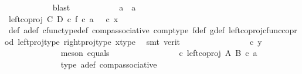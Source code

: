 \begin{isabellebody}
\ \ \ \ \ \ \ \ \ \ \isamarkupfalse%
\ blast\isanewline
\ \ \ \ \ \ \ \ \isamarkupfalse%
\ \isamarkupfalse%
\ {\isachardoublequoteopen}a\ {\isacharequal}{\kern0pt}\ a{\isacharprime}{\kern0pt}{\isachardoublequoteclose}\isanewline
\ \ \ \ \ \ \ \ \isamarkupfalse%
\ {\isacharminus}{\kern0pt}\ \isanewline
\ \ \ \ \ \ \ \ \ \ \isamarkupfalse%
\ {\isachardoublequoteopen}{\isacharparenleft}{\kern0pt}left{\isacharunderscore}{\kern0pt}coproj\ C\ D\ {\isasymcirc}\isactrlsub c\ f{\isacharparenright}{\kern0pt}\ {\isasymcirc}\isactrlsub c\ a\ {\isacharequal}{\kern0pt}\ {\isasymphi}\ {\isasymcirc}\isactrlsub c\ x{\isachardoublequoteclose}\isanewline
\ \ \ \ \ \ \ \ \ \ \ \ \isamarkupfalse%
\ {\isasymphi}{\isacharunderscore}{\kern0pt}def\ a{\isacharunderscore}{\kern0pt}def\ cfunc{\isacharunderscore}{\kern0pt}type{\isacharunderscore}{\kern0pt}def\ comp{\isacharunderscore}{\kern0pt}associative\ comp{\isacharunderscore}{\kern0pt}type\ f{\isacharunderscore}{\kern0pt}def\ g{\isacharunderscore}{\kern0pt}def\ left{\isacharunderscore}{\kern0pt}coproj{\isacharunderscore}{\kern0pt}cfunc{\isacharunderscore}{\kern0pt}coprod\ left{\isacharunderscore}{\kern0pt}proj{\isacharunderscore}{\kern0pt}type\ right{\isacharunderscore}{\kern0pt}proj{\isacharunderscore}{\kern0pt}type\ x{\isacharunderscore}{\kern0pt}type\ \isamarkupfalse%
\ {\isacharparenleft}{\kern0pt}smt\ {\isacharparenleft}{\kern0pt}verit{\isacharparenright}{\kern0pt}{\isacharparenright}{\kern0pt}\isanewline
\ \ \ \ \ \ \ \ \ \ \isamarkupfalse%
\ \isamarkupfalse%
\ {\isachardoublequoteopen}{\isachardot}{\kern0pt}{\isachardot}{\kern0pt}{\isachardot}{\kern0pt}\ {\isacharequal}{\kern0pt}\ {\isasymphi}\ {\isasymcirc}\isactrlsub c\ y{\isachardoublequoteclose}\isanewline
\ \ \ \ \ \ \ \ \ \ \ \ \isamarkupfalse%
\ {\isacharparenleft}{\kern0pt}meson\ equals{\isacharparenright}{\kern0pt}\isanewline
\ \ \ \ \ \ \ \ \ \ \isamarkupfalse%
\ \isamarkupfalse%
\ {\isachardoublequoteopen}{\isachardot}{\kern0pt}{\isachardot}{\kern0pt}{\isachardot}{\kern0pt}\ {\isacharequal}{\kern0pt}\ {\isacharparenleft}{\kern0pt}{\isasymphi}\ {\isasymcirc}\isactrlsub c\ left{\isacharunderscore}{\kern0pt}coproj\ A\ B{\isacharparenright}{\kern0pt}\ {\isasymcirc}\isactrlsub c\ a{\isacharprime}{\kern0pt}{\isachardoublequoteclose}\isanewline
\ \ \ \ \ \ \ \ \ \ \ \ \isamarkupfalse%
\ {\isasymphi}{\isacharunderscore}{\kern0pt}type\ a{\isacharprime}{\kern0pt}{\isacharunderscore}{\kern0pt}def\ comp{\isacharunderscore}{\kern0pt}associative{}\ \isamarkupfalse%

\end{isabellebody}
